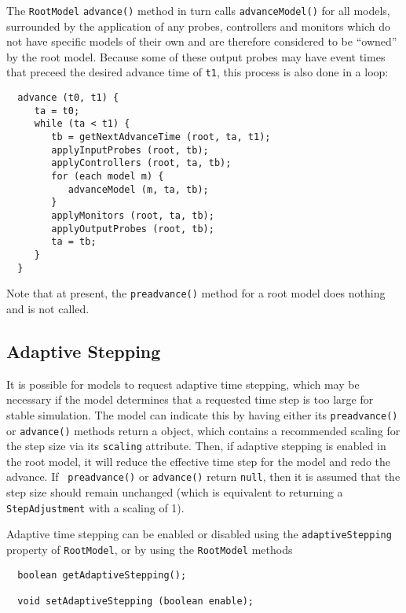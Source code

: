 \documentclass{article}
\begin{document}
The {\tt RootModel} {\tt advance()} method in turn calls {\tt advanceModel()}
for all models, surrounded by the application of any
probes, controllers and monitors which do not have specific models of
their own and are therefore considered to be ``owned'' by the root
model. Because some of these output probes may have event
times that preceed the desired advance time of {\tt t1}, this process
is also done in a loop:
\begin{lstlisting}
  advance (t0, t1) {
     ta = t0;
     while (ta < t1) {
        tb = getNextAdvanceTime (root, ta, t1);
        applyInputProbes (root, tb);
        applyControllers (root, ta, tb);
        for (each model m) {
           advanceModel (m, ta, tb);
        }
        applyMonitors (root, ta, tb);
        applyOutputProbes (root, tb);
        ta = tb;
     }
  }
\end{lstlisting}

Note that at present, the {\tt preadvance()} method for a root model
does nothing and is not called.


\subsection{Adaptive Stepping}
\label{AdaptiveSteppingSec}

It is possible for models to request adaptive time stepping, which may
be necessary if the model determines that a requested time step is too
large for stable simulation. The model can indicate this by having
either its {\tt preadvance()} or {\tt advance()} methods return a
 object, which contains a recommended
scaling for the step size via its {\tt scaling} attribute.  Then, if
adaptive stepping is enabled in the root model, it will reduce the
effective time step for the model and redo the advance.  If {\tt
preadvance()} or {\tt advance()} return {\tt null}, then it is assumed
that the step size should remain unchanged (which is equivalent to
returning a {\tt StepAdjustment} with a scaling of 1).

Adaptive time stepping can be enabled or disabled using the {\tt adaptiveStepping}
property of {\tt RootModel}, or by using the {\tt RootModel} methods
\begin{lstlisting}
  boolean getAdaptiveStepping();

  void setAdaptiveStepping (boolean enable);
\end{lstlisting}
\end{document}

